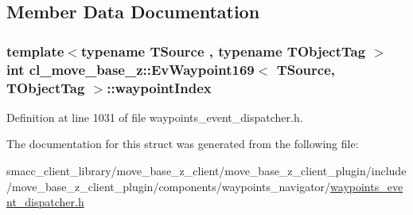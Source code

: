 \subsection{Member Data Documentation}
\subsubsection[{\texorpdfstring{waypoint\+Index}{waypointIndex}}]{\setlength{\rightskip}{0pt plus 5cm}template$<$typename T\+Source , typename T\+Object\+Tag $>$ int {\bf cl\+\_\+move\+\_\+base\+\_\+z\+::\+Ev\+Waypoint169}$<$ T\+Source, T\+Object\+Tag $>$\+::waypoint\+Index}\hypertarget{structcl__move__base__z_1_1EvWaypoint169_a4fdb3343d1e9a763ee1181ecd47b25f7}{}\label{structcl__move__base__z_1_1EvWaypoint169_a4fdb3343d1e9a763ee1181ecd47b25f7}


Definition at line 1031 of file waypoints\+\_\+event\+\_\+dispatcher.\+h.



The documentation for this struct was generated from the following file\+:\begin{DoxyCompactItemize}
\item 
smacc\+\_\+client\+\_\+library/move\+\_\+base\+\_\+z\+\_\+client/move\+\_\+base\+\_\+z\+\_\+client\+\_\+plugin/include/move\+\_\+base\+\_\+z\+\_\+client\+\_\+plugin/components/waypoints\+\_\+navigator/\hyperlink{waypoints__event__dispatcher_8h}{waypoints\+\_\+event\+\_\+dispatcher.\+h}\end{DoxyCompactItemize}
